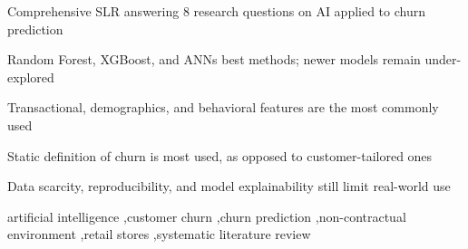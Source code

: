 \documentclass[preprint,12pt]{elsarticle}
\begin{document}
\begin{frontmatter}

\begin{highlights}
\item Comprehensive SLR answering 8 research questions on AI applied to churn prediction
\item Random Forest, XGBoost, and ANNs best methods; newer models remain under-explored
\item Transactional, demographics, and behavioral features are the most commonly used
\item Static definition of churn is most used, as opposed to customer-tailored ones
\item Data scarcity, reproducibility, and model explainability still limit real-world use 
\end{highlights}

\begin{keyword}
artificial intelligence \sep customer churn \sep churn prediction \sep non-contractual environment \sep retail stores \sep systematic literature review  
\end{keyword}

\end{frontmatter}










 



\newpage

\end{document}
